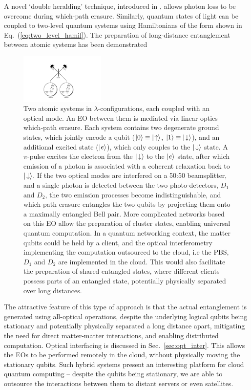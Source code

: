 A novel `double heralding' technique, introduced in \cite{bib:BarrettKok05}, allows photon loss to be overcome during which-path erasure. Similarly, quantum states of light can be coupled to two-level quantum systems using Hamiltonians of the form shown in Eq.~(\ref{eq:two_level_hamil}). The preparation of long-distance entanglement between atomic systems has been demonstrated \cite{bib:Matsukevich05, bib:Matsukevich05b}

\begin{figure}[!htbp]
\includegraphics[clip=true, width=0.375\textwidth]{barrett_kok}
\captionspacefig \caption{Two atomic systems in $\lambda$-configurations, each coupled with an optical mode. An EO between them is mediated via linear optics which-path erasure. Each system contains two degenerate ground states, which jointly encode a qubit (\mbox{$|0\rangle\equiv|\!\uparrow\rangle$}, \mbox{$|1\rangle\equiv|\!\downarrow\rangle$}), and an additional excited state ($|e\rangle$), which only couples to the $|\!\downarrow\rangle$ state. A $\pi$-pulse excites the electron from the $|\!\downarrow\rangle$ to the $|e\rangle$ state, after which emission of a photon is associated with a coherent relaxation back to $|\!\downarrow\rangle$. If the two optical modes are interfered on a 50:50 beamsplitter, and a single photon is detected between the two photo-detectors, $D_1$ and $D_2$, the two emission processes become indistinguishable, and which-path erasure entangles the two qubits by projecting them onto a maximally entangled Bell pair. More complicated networks based on this EO allow the preparation of cluster states, enabling universal quantum computation. In a quantum networking context, the matter qubits could be held by a client, and the optical interferometry implementing the computation outsourced to the cloud, i.e the PBS, $D_1$ and $D_2$ are implemented in the cloud. This would also facilitate the preparation of shared entangled states, where different clients possess parts of an entangled state, potentially physically separated over long distances.} \label{fig:barrett_kok}
\end{figure}

The attractive feature of this type of approach is that the actual entanglement is generated using all-optical operations, despite the underlying logical qubits being stationary and potentially physically separated a long distance apart, mitigating the need for direct matter-matter interactions, and enabling distributed computation. Optical interfacing is discussed in Sec.~\ref{sec:opt_inter}. This allows the EOs to be performed remotely in the cloud, without physically moving the stationary qubits. Such hybrid systems present an interesting platform for cloud quantum computing -- despite the qubits being stationary, we are able to outsource the interactions between them to distant servers or even satellites.

